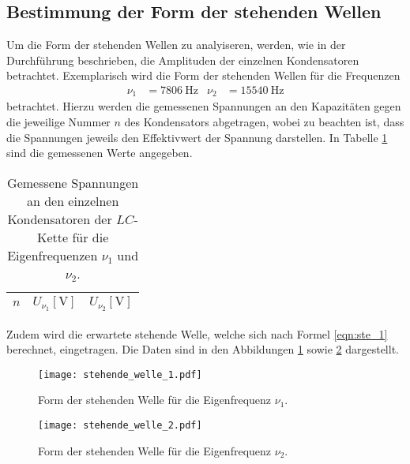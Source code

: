 \subsection{Bestimmung der Form der stehenden Wellen}
Um die Form der stehenden Wellen zu analyiseren, werden, wie in der Durchführung beschrieben, die Amplituden der einzelnen Kondensatoren betrachtet.
Exemplarisch wird die Form der stehenden Wellen für die Frequenzen
\begin{align*}
  \nu_1 &= \SI{7806}{\hertz} & \nu_2 &= \SI{15540}{\hertz}
\end{align*}
betrachtet.
Hierzu werden die gemessenen Spannungen an den Kapazitäten gegen die jeweilige Nummer $n$ des Kondensators abgetragen, wobei zu beachten ist, dass die Spannungen jeweils den Effektivwert der Spannung darstellen.
In Tabelle \ref{tab:stehend1} sind die gemessenen Werte angegeben.
\begin{table}
  \centering
  \caption{Gemessene Spannungen an den einzelnen Kondensatoren der $LC$-Kette für die Eigenfrequenzen $\nu_1$ und $\nu_2$.}
  \label{tab:stehend1}
  \begin{tabular}{c c c}
    \toprule
    {$n$} & {$U_{\nu_1} [\si{\volt}]$} & {$U_{\nu_2} [\si{\volt}]$}\\
    \midrule
    
    \bottomrule
  \end{tabular}
\end{table}

Zudem wird die erwartete stehende Welle, welche sich nach Formel \ref{eqn:ste_1} berechnet, eingetragen.
Die Daten sind in den Abbildungen \ref{fig:stehend1} sowie \ref{fig:stehend2} dargestellt.

\begin{figure}[H]
  \centering
  \texttt{[image: stehende\_welle\_1.pdf]}
  \caption{Form der stehenden Welle für die Eigenfrequenz $\nu_1$.}
  \label{fig:stehend1}
\end{figure}

\begin{figure}[H]
  \centering
  \texttt{[image: stehende\_welle\_2.pdf]}
  \caption{Form der stehenden Welle für die Eigenfrequenz $\nu_2$.}
  \label{fig:stehend2}
\end{figure}

